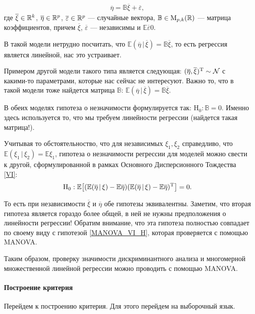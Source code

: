 \begin{gather*}
    \overline \eta = \mathbb B \overline \xi + \overline \varepsilon,
\end{gather*}
где $\overline \xi \in \mathbb{R}^k$, $\overline \eta \in \mathbb{R}^p$, $\overline {\varepsilon} \in \mathbb{R}^p$ ---
случайные вектора, $\mathbb B \in \mathrm M_{p, k}(\mathbb{R})$ --- матрица коэффициентов,
причем $\overline \xi$, $\overline \varepsilon$ --- независимы и $\mathbb E \overline \varepsilon 0$.

В такой модели нетрудно посчитать, что $\mathbb E(\overline \eta \, | \, \overline \xi) = \mathbb B \overline \xi$,
то есть регрессия является линейной, нас это устраивает.

Примером другой модели такого типа является следующая: $(\overline \eta, \overline \xi)^{\mathrm{T}} \sim \mathcal N$ с
какими-то параметрами, которые нас сейчас не интересуют. Важно то, что в такой модели
тоже найдется матрица $\mathbb B$: $\mathbb E(\overline \eta \, | \, \overline \xi) = \mathbb B \overline \xi$.

В обеих моделях гипотеза о незначимости формулируется так: $\mathrm H_0: \mathbb B = 0$.
Именно здесь используется то, что мы требуем линейности регрессии (найдется такая матрица!).

Учитывая то обстоятельноство, что для независимых $\xi_1, \xi_2$ справедливо, что $\mathbb E (\xi_1 \, | \, \xi_2) = \mathbb E\xi_1$,
гипотеза о незначимости регрессии для моделей можно свести к другой, сформулированной в рамках Основного Дисперсионного Тождества
\eqref{VI}:
\begin{gather*}
    \mathrm H_0:
    \mathbb E \big[(\mathbb E (\overline \eta \, | \, \xi) - \mathbb E \overline \eta)
              (\mathbb E (\overline \eta \, | \, \xi) - \mathbb E \overline \eta)^{\mathrm{T}}\big]
    = 0.
\end{gather*}

То есть при независимости $\overline \xi$ и $\overline \eta$ обе гипотезы эквивалентны.
Заметим, что вторая гипотеза является гораздо более общей, в ней не нужны предположения о линейности регрессии!
Обратим внимание, что эта гипотеза полностью совпадает по своему виду с гипотезой \eqref{MANOVA_VI_H},
которая проверяется с помощью MANOVA.

\bigskip
Таким образом, проверку значимости дискриминантного анализа и многомерной множественной линейной регрессии можно проводить с помощью
MANOVA.

\paragraph{Построение критерия}
Перейдем к построению критерия. Для этого перейдем на выборочный язык.


